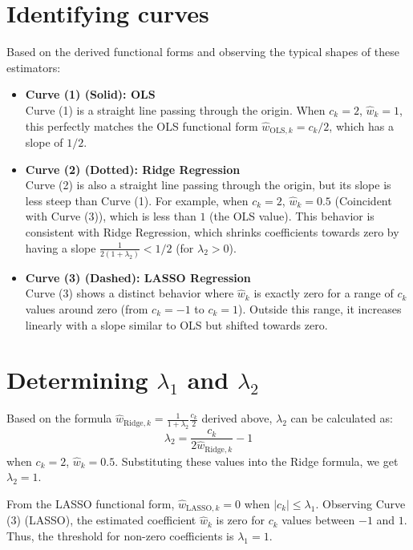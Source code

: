 \documentclass[11pt, a4paper, oneside]{memoir}
\begin{document}
\section{Identifying curves}
Based on the derived functional forms and observing the typical shapes of these estimators:
\begin{itemize}
    \item \textbf{Curve (1) (Solid): OLS} \\
          Curve (1) is a straight line passing through the origin. When $c_k=2$, $\hat{w}_k=1$,
          this perfectly matches the OLS functional form $\hat{w}_{\text{OLS},k} = c_k / 2$, which has a slope of $1/2$.
    \item \textbf{Curve (2) (Dotted): Ridge Regression} \\
          Curve (2) is also a straight line passing through the origin, but its slope is less steep than Curve (1).
          For example, when $c_k=2$, $\hat{w}_k = 0.5$ (Coincident with Curve (3)), which is less than $1$ (the OLS value). This behavior is consistent with Ridge Regression,
          which shrinks coefficients towards zero by having a slope $\frac{1}{2(1 + \lambda_2)} < 1/2$ (for $\lambda_2 > 0$).
    \item \textbf{Curve (3) (Dashed): LASSO Regression} \\
          Curve (3) shows a distinct behavior where $\hat{w}_k$ is exactly zero for a range of $c_k$ values around zero (from $c_k = -1$ to $c_k = 1$).
          Outside this range, it increases linearly with a slope similar to OLS but shifted towards zero.
\end{itemize}

\section[Determining lambda1 and lambda2]{Determining $\lambda_1$ and $\lambda_2$}
Based on the formula $\hat{w}_{\text{Ridge},k} = \frac{1}{1 + \lambda_2} \frac{c_k}{2}$ derived above, $\lambda_2$ can be calculated as:
\[ \lambda_2 = \frac{c_k}{2 \hat{w}_{\text{Ridge},k}} - 1 \]
when $c_k = 2$, $\hat{w}_k = 0.5$. Substituting these values into the Ridge formula, we get $\lambda_2 = 1$.

From the LASSO functional form, $\hat{w}_{\text{LASSO},k} = 0$ when $|c_k| \le \lambda_1$.
Observing Curve (3) (LASSO), the estimated coefficient $\hat{w}_k$ is zero for $c_k$ values between $-1$ and $1$.
Thus, the threshold for non-zero coefficients is $\lambda_1 = 1$.
\end{document}
